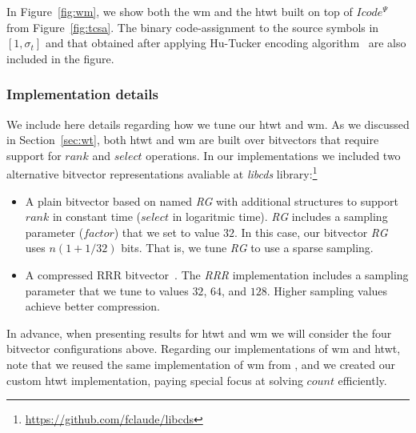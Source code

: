 	In Figure~\ref{fig:wm}, we show both the \gls{wm} and the \gls{htwt} built on top of $Icode^{\Psi}$ from Figure~\ref{fig:tcsa}.
	The binary code-assignment to the source symbols in $[1,\sigma_t]$ and that obtained after applying Hu-Tucker encoding
	algorithm~\cite{hu1971optimal} are also included in the figure.

	\subsubsection{Implementation details} We include here details regarding how we tune our \gls{htwt} and \gls{wm}.
	As we discussed in Section~\ref{sec:wt}, both \gls{htwt} and \gls{wm} are built over bitvectors that require
	support for $rank$ and $select$ operations. In our implementations we included two alternative bitvector representations avaliable
	at {\em libcds} library:{\footnote{\url{https://github.com/fclaude/libcds}}}


	\begin{itemize}
		\item A plain bitvector based on \cite{Mun96} named {\em RG} with 
		additional structures to support $rank$ in constant time ($select$ in logaritmic time).
		{\em RG} includes a sampling parameter ($factor$) that we set to value $32$. In this case,
		our  bitvector {\em RG} uses $n (1+1/32)$ bits. That is, we tune {\em RG} to use a sparse sampling. 
			
		\item A compressed RRR bitvector~\cite{Raman:2002:SID:545381.545411}. The {\em RRR} implementation includes
		a sampling parameter that we tune to values $32$, $64$, and $128$. Higher sampling values achieve better compression.
		
	\end{itemize}


	In advance, when presenting results for \gls{htwt} and \gls{wm} we will consider the four bitvector configurations
	above. Regarding our implementations of \gls{wm} and \gls{htwt}, note that we reused the same implementation of \gls{wm} from \cite{CNO15}, 
	and we created our custom \gls{htwt} implementation, paying special focus at solving $count$ efficiently. 


